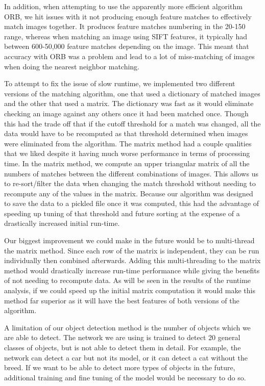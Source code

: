 \documentclass[12pt]{article}
\begin{document}
	In addition, when attempting to use the apparently more efficient algorithm ORB, we hit issues with it not producing enough feature matches to effectively match images together. It produces feature matches numbering in the 20-150 range, whereas when matching an image using SIFT features, it typically had between 600-50,000 feature matches depending on the image. This meant that accuracy with ORB was a problem and lead to a lot of miss-matching of images when doing the nearest neighbor matching.

	To attempt to fix the issue of slow runtime, we implemented two different versions of the matching algorithm, one that used a dictionary of matched images and the other that used a matrix. The dictionary was fast as it would eliminate checking an image against any others once it had been matched once. Though this had the trade off that if the cutoff threshold for a match was changed, all the data would have to be recomputed as that threshold determined when images were eliminated from the algorithm. The matrix method had a couple qualities that we liked despite it having much worse performance in terms of processing time. In the matrix method, we compute an upper triangular matrix of all the numbers of matches between the different combinations of images. This allows us to re-sort/filter the data when changing the match threshold without needing to recompute any of the values in the matrix. Because our algorithm was designed to save the data to a pickled file once it was computed, this had the advantage of speeding up tuning of that threshold and future sorting at the expense of a drastically increased initial run-time. 
	
	Our biggest improvement we could make in the future would be to multi-thread the matrix method. Since each row of the matrix is independent, they can be run individually then combined afterwards. Adding this multi-threading to the matrix method would drastically increase run-time performance while giving the benefits of not needing to recompute data. As will be seen in the results of the runtime analysis, if we could speed up the initial matrix computation it would make this method far superior as it will have the best features of both versions of the algorithm.

	
	
	A limitation of our object detection method is the number of objects which we are able to detect. The network we are using is trained to detect 20 general classes of objects, but is not able to detect them in detail. For example, the network can detect a car but not its model, or it can detect a cat without the breed. If we want to be able to detect more types of objects in the future, additional training and fine tuning of the model would be necessary to do so.
	
\end{document}
